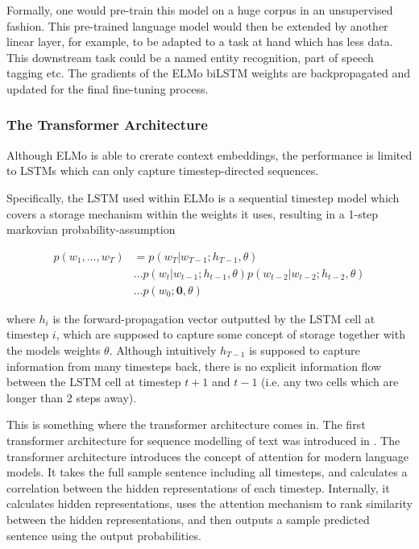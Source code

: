 \documentclass[a4paper,12pt,twoside,openright]{report}
\begin{document}

Formally, one would pre-train this model on a huge corpus in an unsupervised fashion.
This pre-trained language model would then be extended by another linear layer, for example, to be adapted to a task at hand which has less data.
This downstream task could be a named entity recognition, part of speech tagging etc.
The gradients of the ELMo biLSTM weights are backpropagated and updated for the final fine-tuning process.



\subsubsection{The Transformer Architecture}

Although ELMo is able to crerate context embeddings, the performance is limited to LSTMs which can only capture timestep-directed sequences.

Specifically, the LSTM used within ELMo is a sequential timestep model which covers a storage mechanism within the weights it uses, resulting  in a 1-step markovian probability-assumption

\begin{align}
p(w_1, \ldots, w_T) &= p(w_T | w_{T-1}; h_{T-1}, \theta) \nonumber  \\
& \ldots p(w_t | w_{t-1}; h_{t-1}, \theta) p(w_{t-2} | w_{t-2}; h_{t-2}, \theta) \nonumber \\
& \ldots p(w_0 ; \mathbf{0}, \theta) 
\end{align}

where $h_{i}$ is the forward-propagation vector outputted by the LSTM cell at timestep $i$, which are supposed to capture some concept of storage together with the models weights $\theta$.
Although intuitively $h_{T-1}$ is supposed to capture information from many timesteps back, there is no explicit information flow between the LSTM cell at timestep $t+1$ and $t-1$ (i.e. any two cells which are longer than 2 steps away).

This is something where the transformer architecture comes in.
The first transformer architecture for sequence modelling of text was introduced in \cite{vaswani17}.
The transformer architecture introduces the concept of attention for modern language models.
It takes the full sample sentence including all timesteps, and calculates a correlation between the hidden representations of each timestep.
Internally, it calculates hidden representations, uses the attention mechanism to rank similarity between the hidden representations, and then outputs a sample predicted sentence using the output probabilities.
\end{document}
